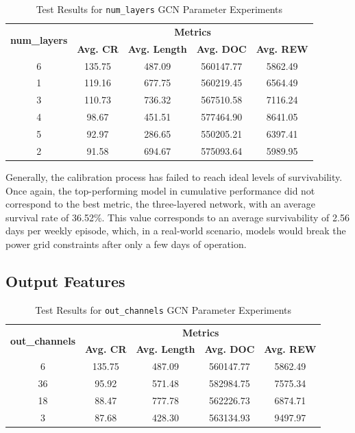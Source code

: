   \begin{table}[h!]
	\centering
	\caption{Test Results for \texttt{num\_layers} \ac{GCN} Parameter Experiments}
	\begin{tabular}{ccccc}
		\toprule
		\multirow{2}{*}{\textbf{num\_layers}} & \multicolumn{4}{c}{\textbf{Metrics}} \\ 
		\cmidrule(lr){2-5}
		&  \textbf{Avg. CR} & \textbf{Avg. Length} & \textbf{Avg. DOC} & \textbf{Avg. REW} \\ 
		\midrule
		
		6 & 135.75 & 487.09 & 560147.77 & 5862.49 \\
		1 & 119.16 & 677.75 & 560219.45 & 6564.49 \\
		3 & 110.73 & 736.32 & 567510.58 & 7116.24 \\
		4 & 98.67 & 451.51 & 577464.90 & 8641.05 \\
		5 & 92.97 & 286.65 & 550205.21 & 6397.41 \\
		2 & 91.58 & 694.67 & 575093.64 & 5989.95 \\
		\bottomrule
	\end{tabular}
	\label{tab:test-layers}
\end{table}

Generally, the calibration process has failed to reach ideal levels of survivability.
Once again, the top-performing model in cumulative performance did not correspond to the best metric, the three-layered network, with an average survival rate of 36.52\%. This value corresponds to an average survivability of 2.56 days per weekly episode, which, in a real-world scenario, models would break the power grid constraints after only a few days of operation. 

\subsection{Output Features} \label{sec:results-out}
 
  \begin{table}[h!]
	\centering
	\caption{Test Results for \texttt{out\_channels} \ac{GCN} Parameter Experiments}
	\begin{tabular}{ccccc}
		\toprule
		\multirow{2}{*}{\textbf{out\_channels}} & \multicolumn{4}{c}{\textbf{Metrics}} \\ 
		\cmidrule(lr){2-5}
		&  \textbf{Avg. CR} & \textbf{Avg. Length} & \textbf{Avg. DOC} & \textbf{Avg. REW} \\ 
		\midrule
		6 & 135.75 & 487.09 & 560147.77 & 5862.49 \\
		36 & 95.92 & 571.48 & 582984.75 & 7575.34 \\
		18 & 88.47 & 777.78 & 562226.73 & 6874.71 \\
		3 & 87.68 & 428.30 & 563134.93 & 9497.97 \\
		\bottomrule
	\end{tabular}
	\label{tab:test-gcn-out}
\end{table}


